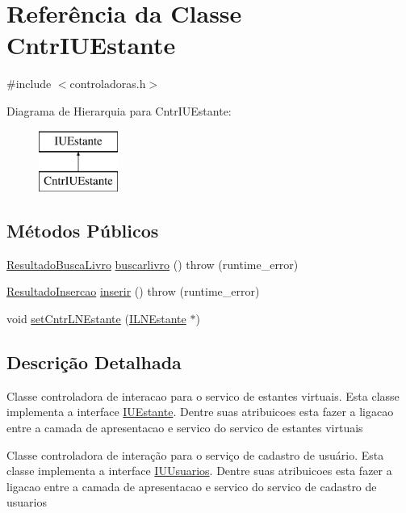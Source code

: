 \hypertarget{class_cntr_i_u_estante}{}\section{Referência da Classe Cntr\+I\+U\+Estante}
\label{class_cntr_i_u_estante}


{\ttfamily \#include $<$controladoras.\+h$>$}

Diagrama de Hierarquia para Cntr\+I\+U\+Estante\+:\begin{figure}[H]
\begin{center}
\leavevmode
\includegraphics[height=2.000000cm]{class_cntr_i_u_estante}
\end{center}
\end{figure}
\subsection*{Métodos Públicos}
\begin{DoxyCompactItemize}
\item 
\hyperlink{class_resultado_busca_livro}{Resultado\+Busca\+Livro} \hyperlink{class_cntr_i_u_estante_a0ada4c7c0131f888081aa446bbd92f64}{buscarlivro} ()  throw (runtime\+\_\+error)
\item 
\hyperlink{class_resultado_insercao}{Resultado\+Insercao} \hyperlink{class_cntr_i_u_estante_abe47425cb3d9951b31401b1540dc95a4}{inserir} ()  throw (runtime\+\_\+error)
\item 
void \hyperlink{class_cntr_i_u_estante_ade15f7b3b360e31d1df95c4fe7bd65e9}{set\+Cntr\+L\+N\+Estante} (\hyperlink{class_i_l_n_estante}{I\+L\+N\+Estante} $\ast$)
\end{DoxyCompactItemize}


\subsection{Descrição Detalhada}
Classe controladora de interacao para o servico de estantes virtuais. Esta classe implementa a interface \hyperlink{class_i_u_estante}{I\+U\+Estante}. Dentre suas atribuicoes esta fazer a ligacao entre a camada de apresentacao e servico do servico de estantes virtuais

Classe controladora de interação para o serviço de cadastro de usuário. Esta classe implementa a interface \hyperlink{class_i_u_usuarios}{I\+U\+Usuarios}. Dentre suas atribuicoes esta fazer a ligacao entre a camada de apresentacao e servico do servico de cadastro de usuarios 

